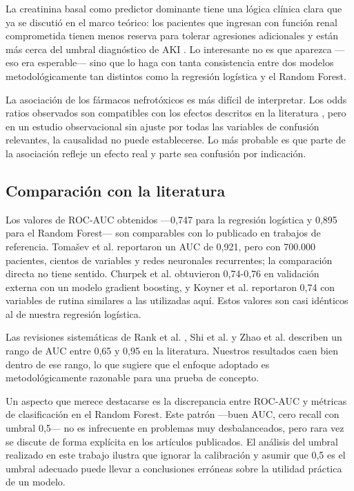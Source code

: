 \documentclass[12pt, a4paper, oneside]{report}
\begin{document}
La creatinina basal como predictor dominante tiene una lógica clínica clara que ya se discutió en el marco teórico: los pacientes que ingresan con función renal comprometida tienen menos reserva para tolerar agresiones adicionales y están más cerca del umbral diagnóstico de AKI \parencite{chawla2014akickd, kellum2021acute}. Lo interesante no es que aparezca —eso era esperable— sino que lo haga con tanta consistencia entre dos modelos metodológicamente tan distintos como la regresión logística y el Random Forest.

La asociación de los fármacos nefrotóxicos es más difícil de interpretar. Los odds ratios observados son compatibles con los efectos descritos en la literatura \parencite{perazella2019drug, perazella2022drugaki}, pero en un estudio observacional sin ajuste por todas las variables de confusión relevantes, la causalidad no puede establecerse. Lo más probable es que parte de la asociación refleje un efecto real y parte sea confusión por indicación.

\subsection{Comparación con la literatura}

Los valores de ROC-AUC obtenidos —0,747 para la regresión logística y 0,895 para el Random Forest— son comparables con lo publicado en trabajos de referencia. Tomašev et al. \parencite{tomasev2019nature} reportaron un AUC de 0,921, pero con 700.000 pacientes, cientos de variables y redes neuronales recurrentes; la comparación directa no tiene sentido. Churpek et al. \parencite{churpek2020validation} obtuvieron 0,74-0,76 en validación externa con un modelo gradient boosting, y Koyner et al. \parencite{koyner2018ml} reportaron 0,74 con variables de rutina similares a las utilizadas aquí. Estos valores son casi idénticos al de nuestra regresión logística.

Las revisiones sistemáticas de Rank et al. \parencite{rank2022mlaki}, Shi et al. \parencite{shi2025aiaki} y Zhao et al. \parencite{zhao2024akiml} describen un rango de AUC entre 0,65 y 0,95 en la literatura. Nuestros resultados caen bien dentro de ese rango, lo que sugiere que el enfoque adoptado es metodológicamente razonable para una prueba de concepto.

Un aspecto que merece destacarse es la discrepancia entre ROC-AUC y métricas de clasificación en el Random Forest. Este patrón —buen AUC, cero recall con umbral 0,5— no es infrecuente en problemas muy desbalanceados, pero rara vez se discute de forma explícita en los artículos publicados. El análisis del umbral realizado en este trabajo ilustra que ignorar la calibración y asumir que 0,5 es el umbral adecuado puede llevar a conclusiones erróneas sobre la utilidad práctica de un modelo.
\end{document}
